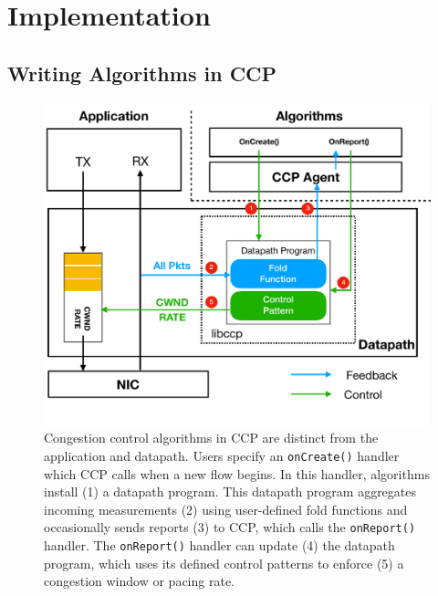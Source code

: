 \chapter{Implementation}

\section{Writing Algorithms in CCP}
%
\begin{figure}[h]
\centering
    \includegraphics[width=\columnwidth]{img/ccp_design_sigcomm}
    \caption{Congestion control algorithms in CCP are distinct from the application and datapath.
    Users specify an \texttt{onCreate()} handler which CCP calls when a new flow begins. 
    In this handler, algorithms install (1) a datapath program. 
    This datapath program aggregates incoming measurements (2) using user-defined fold functions and occasionally sends reports (3) to CCP, which calls the \texttt{onReport()} handler.
    The \texttt{onReport()} handler can update (4) the datapath program, which uses its defined control patterns to enforce (5) a congestion window or pacing rate.
    }\label{fig:design}
\end{figure}

